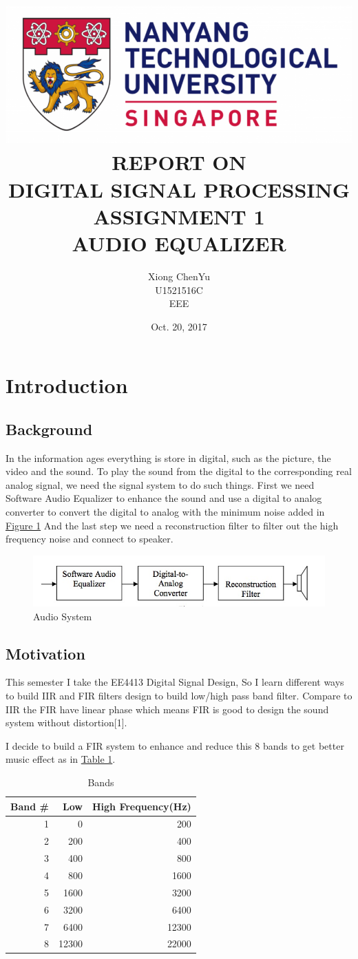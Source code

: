 \documentclass[titlepage]{article}
\author{Xiong ChenYu \\
U1521516C \\
EEE \\
}
\date{Oct. 20, 2017 \\
}
\title{\includegraphics[width=\textwidth]{img/NTU.png} \\
[2\baselineskip] REPORT ON \\
DIGITAL SIGNAL PROCESSING \\
ASSIGNMENT 1 \\
AUDIO EQUALIZER \\
[2\baselineskip]}
\begin{document}
\maketitle
\tableofcontents

\listoftables
\listoffigures

\newpage
\section{Introduction}
\label{sec:org86ca508}
\subsection{Background}
\label{sec:org8d487b3}
In the information ages everything is store in digital, such as the picture,
the video and the sound. To play the sound from the digital to the
corresponding real analog signal, we need the signal system to do such
things. First we need Software Audio Equalizer to enhance the sound and use a
digital to analog converter to convert the digital to analog with the minimum
noise added in \hyperref[fig:org83e9ed3]{Figure 1} And the last step we need a reconstruction filter to filter out
the high frequency noise and connect to speaker.

\begin{figure}[htbp]
\caption{\label{fig:org83e9ed3}
Audio System}
\centering
\includegraphics[width=12cm]{./img/audio.png}
\end{figure}

\subsection{Motivation}
\label{sec:orgdb84646}
This semester I take the EE4413 Digital Signal Design, So I learn different
ways to build IIR and FIR filters design to build low/high pass band filter.
Compare to IIR the FIR have linear phase which means FIR is good to design
the sound system without distortion[1].

I decide to build a FIR system to enhance and reduce this 8 bands to get
better music effect as in \hyperref[tab:org3955e82]{Table 1}.
\begin{table}[htbp]
\caption{\label{tab:org3955e82}
Bands}
\centering
\begin{tabular}{rrr}
Band \# & Low & High Frequency(Hz)\\
\hline
1 & 0 & 200\\
2 & 200 & 400\\
3 & 400 & 800\\
4 & 800 & 1600\\
5 & 1600 & 3200\\
6 & 3200 & 6400\\
7 & 6400 & 12300\\
8 & 12300 & 22000\\
\end{tabular}
\end{table}
\end{document}
